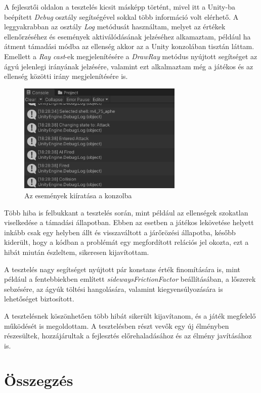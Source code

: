 \documentclass[
]{thesis-ekf}
\theoremstyle{definition}
\theoremstyle{remark}
\begin{document}
A fejlesztői oldalon a tesztelés kicsit másképp történt, mivel itt a Unity-ba beépített \emph{Debug} osztály segítségével sokkal több információ volt elérhető. A leggyakrabban az osztály \emph{Log} metódusát használtam, melyet az értékek ellenőrzéséhez és események aktiválódásának jelzéséhez alkamaztam, például ha átment támadási módba az ellenség akkor az a Unity konzolában tisztán láttam. Emellett a \emph{Ray cast}-ek megjelenítésére a \emph{DrawRay} metódus nyújtott segítséget az ágyú jelenlegi irányának jelzésére, valamint ezt alkalmaztam még a játékos és az ellenség közötti irány megjelenítésére is.

\begin{figure}[H]
    \centering
    \includegraphics[width=0.7\textwidth]{screenshots/logging.png}
    \caption{Az események kiíratása a konzolba}
    \label{fig:logging}
\end{figure}

Több hiba is felbukkant a tesztelés során, mint például az ellenségek szokatlan viselkedése a támadási állapotban. Ebben az esetben a játékos lekövetése helyett inkább csak egy helyben állt és visszaváltott a járőrözési állapotba, később kiderült, hogy a kódban a problémát egy megfordított relációs jel okozta, ezt a hibát miután észleltem, sikeresen kijavítottam.

A tesztelés nagy segítséget nyújtott pár konstans érték finomítására is, mint például a fentebbiekben említett \emph{sidewaysFrictionFactor} beállításában, a lőszerek sebzésére, az ágyúk töltési hangolására, valamint kiegyensúlyozására is lehetőséget biztosított.

A tesztelésnek köszönhetően több hibát sikerült kijavítanom, és a játék megfelelő működését is megoldottam. A tesztelésben részt vevők egy új élményben részesültek, hozzájárultak a fejlesztés előrehaladásához és az élmény javításához is.

\chapter*{Összegzés}
\end{document}
